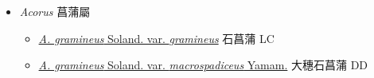 
  \begin{itemize}
 \item[] \textit{Acorus} 菖蒲屬
                    
  \begin{itemize}
        \item[] \href{http://www.theplantlist.org/tpl1.1/search?q=Acorus+gramineus+var.+gramineus}{\textit{A. gramineus} Soland. var. \textit{gramineus}}   石菖蒲 LC
        \item[] \href{http://www.theplantlist.org/tpl1.1/search?q=Acorus+gramineus+var.+macrospadiceus}{\textit{A. gramineus} Soland. var. \textit{macrospadiceus} Yamam.}   大穗石菖蒲 DD
  \end{itemize}
  \end{itemize}
